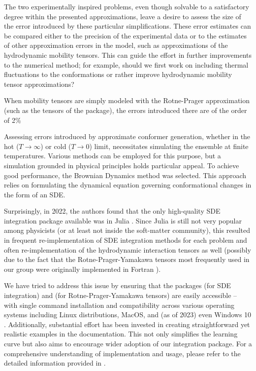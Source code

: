 \documentclass{doctoral}
\newcommand{\code}[1]{\texttt{\detokenize{#1}}}
\begin{document}
The two experimentally inspired problems, even though solvable to a satisfactory degree within the presented approximations, leave a desire to assess the size of the error introduced by these particular simplifications.
These error estimates can be compared either to the precision of the experimental data or to the estimates of other approximation errors in the model, such as approximations of the hydrodynamic mobility tensors.
This can guide the effort in further improvements to the numerical method; for example, should we first work on including thermal fluctuations to the conformations or rather improve hydrodynamic mobility tensor approximations?

When mobility tensors are simply modeled with the Rotne-Prager approximation (such as the tensors of the \code{pygrpy} package), the errors introduced there are of the order of 2\% 

Assessing errors introduced by approximate conformer generation, whether in the hot ($T\to\infty$) or cold ($T\to0$) limit, necessitates simulating the ensemble at finite temperatures.
Various methods can be employed for this purpose, but a simulation grounded in physical principles holds particular appeal.
To achieve good performance, the Brownian Dynamics method was selected.
This approach relies on formulating the dynamical equation governing conformational changes in the form of an SDE.

Surprisingly, in 2022, the authors found that the only high-quality SDE integration package available was \code{differentialequations.jl} in Julia \cite{Rackauckas_2017}.
Since Julia is still not very popular among physicists (or at least not inside the soft-matter community), this resulted in frequent re-implementation of SDE integration methods for each problem and often re-implementation of the hydrodynamic interaction tensors as well (possibly due to the fact that the Rotne-Prager-Yamakawa tensors most frequently used in our group were originally implemented in Fortran \cite{Zuk_2018}).

We have tried to address this issue by ensuring that the packages \code{pychastic} (for SDE integration) and \code{pygrpy} (for Rotne-Prager-Yamakawa tensors) are easily accessible -- with single command installation and compatibility across various operating systems including Linux distributions, MacOS, and (as of 2023) even Windows 10 \cite{jax_on_windows}.
Additionally, substantial effort has been invested in creating straightforward yet realistic examples in the documentation.
This not only simplifies the learning curve but also aims to encourage wider adoption of our integration package.
For a comprehensive understanding of implementation and usage, please refer to the detailed information provided in \textcite{Waszkiewicz_2023_pychastic}.
\end{document}
